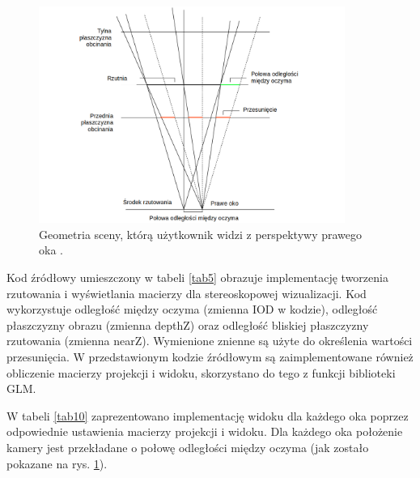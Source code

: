 \begin{figure}[H]
		\centering
 		\includegraphics[width=10cm]{stereoscopicGL.png}
    	\caption{Geometria sceny, którą użytkownik widzi z perspektywy prawego oka \cite{openglCookbook}.}
 		\label{rys10}
\end{figure}

Kod źródłowy umieszczony w tabeli \ref{tab5} obrazuje implementację tworzenia rzutowania i wyświetlania macierzy dla stereoskopowej wizualizacji. Kod wykorzystuje odległość między oczyma (zmienna IOD w kodzie), odległość płaszczyzny obrazu (zmienna depthZ) oraz odległość bliskiej płaszczyzny rzutowania (zmienna nearZ).  Wymienione znienne są użyte do określenia wartości przesunięcia. W przedstawionym kodzie źródłowym są zaimplementowane również obliczenie macierzy projekcji i widoku, skorzystano do tego z funkcji biblioteki GLM. 

W tabeli \ref{tab10} zaprezentowano implementację widoku dla każdego oka poprzez odpowiednie ustawienia macierzy projekcji i widoku. Dla każdego oka położenie kamery jest przekładane o połowę odległości między oczyma (jak zostało pokazane na rys. \ref{rys10}). 

